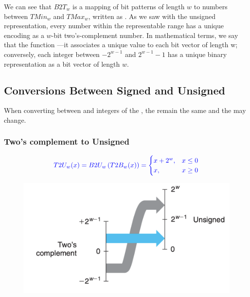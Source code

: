 We can see that $B2T_w$ is a mapping of bit patterns of length $w$ to numbers between $TMin_w$ and $TMax_w$, written as {}. As we saw with the unsigned representation, every number within the representable range has a unique encoding as a $w$-bit two’s-complement number. In mathematical terms, we say that the function {\color{blue}{$B2T_w$ is a bijection}}—it associates a unique value to each bit vector of length w; conversely, each integer between $-2^{w-1}$ and $2^{w-1} - 1$ has a unique binary representation as a bit vector of length $w$.

\subsection{Conversions Between Signed and Unsigned}
When converting between {\color{blue}{signed}} and {\color{blue}{unsigned}} integers of the {\color{blue}{same word size}}, the {\color{blue}{bit patterns}} remain the same and the {\color{blue}{values}} may change.\\

\subsubsection*{Two's complement to Unsigned}
\begin{equation}
{\color{blue}{T2U_w(x) = B2U_w\left(T2B_w(x)\right) = 
\begin{cases} 
x + 2^w, & x \leq 0 \\
x, & x \geq 0 
\end{cases}}}
\end{equation}
\begin{figure}[H]
\centering
\includegraphics[width=0.4\linewidth]{images/t2u}
\label{fig:t2u}
\end{figure}

